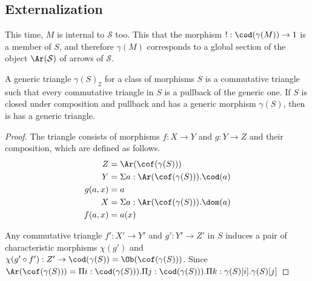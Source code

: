 \documentclass{tac}
\newcommand\hide[1]{}
\newcommand\cat\mathcal
\newcommand\dual{^{\mathrm{op}}}
\newcommand\disc{_{\mathrm{disc}}}
\newcommand\s{^{\simCat\dual}}
\newcommand\bang{!}
\newcommand\of{:}
\newcommand\gen\gamma
\begin{document}
\subsection{Externalization}
This time, $M$ is internal to $\cat S$ too. This that the morphism $\bang\of\cod(\gen(M))\to 1$ is a member of $S$, and therefore $\gen(M)$ corresponds to a global section of the object $\Ar(\cat S)$ of arrows of $\cat S$.

\begin{lemma}
A generic triangle $\gen(S)_2$ for a class of morphisms $S$ is a commutative triangle such that every commutative triangle in $S$ is a pullback of the generic one. If $S$ is closed under composition and pullback and has a generic morphism $\gen(S)$, then is has a generic triangle.
\end{lemma}

\begin{proof}
The triangle consists of morphisms $f\of X\to Y$ and $g\of Y\to Z$ and their composition, which are defined as follows.
\begin{align*}
Z &= \Ar(\cof(\gen(S)))\\
Y &= \Sigma a\of\Ar(\cof(\gen(S))).\cod(a)\\
g(a,x) &= a\\
X &= \Sigma a\of\Ar(\cof(\gen(S))).\dom(a)\\
f(a,x) &= a(x)
\end{align*}

Any commutative triangle $f'\of X'\to Y'$ and $g'\of Y'\to Z'$ in $S$ induces a pair of characteristic morphisms $\chi(g')$ and $\chi(g'\circ f')\of Z'\to \cod(\gen(S))=\Ob(\cof(\gen(S)))$. Since $\Ar(\cof(\gen(S)))=\Pi i\of\cod(\gen(S))).\Pi j\of \cod(\gen(S))).\Pi k\of \gen(S)[i].\gen(S)[j]$ 
\end{proof}



\hide{%
We hebben het wel over een globale sectie van $\Ar(\cof(M)\s)$!

Als $I\to\Ar(\cof(M)\s)$ een familie van fibraties is, dan is de relatie met die globale sectie toch niet zo eenvoudig.

Die klasse $M\s$ is een deelobject van $\Ar(\cof(\gen(M))\s)$.

Er moet een verband zijn: de globale sectie van $\Ar(\cat S)$, het object $M\subseteq \Ar(\cat S)$ en het morphisme $M\to M/M$. 

Kunnen we iets met het object van karateristieken: $\cod\gen(M)^{\cod\gen(S)}$? Voordeel: de gewenste getuige is altijd daar. Nadeel: geen deelobject. Wanneer hebben we daar last van?

Wat vervangt de inclusie?


Omdat $\gen(M)$ een element van $\gen(S)$ in, bestaat er een pullback $\gen(M)\to\gen(S)$. Nu is het niet duidelijk dat daar monomorfismes bij zitten.


Er is steeds een verband tussen $\cat S^{I\disc}$ en $\cat S/I$. 

Ik kom even niet verder dan: een morfisme in $M\s$ is de combinatie van een morfisme in $S\s$ met een getuige van modesty.


}
\end{document}
